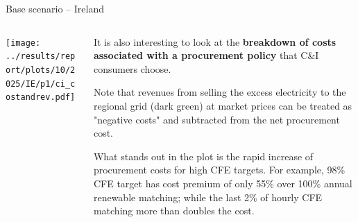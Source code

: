\begin{frame}{Base scenario -- Ireland}

    {\footnotesize
    \vspace{0.3cm}
    
    \begin{columns}[T]
    \begin{column}{9cm}
    \centering
    
    \texttt{[image: ../results/report/plots/10/2025/IE/p1/ci\_costandrev.pdf]}
    \end{column}
    \begin{column}{6cm}
    
    \vspace{0.3cm}
    It is also interesting to look at the {\bf breakdown of costs associated with
    a procurement policy} that C\&I consumers choose. 
    
    \vspace{0.3cm}
    Note that revenues from selling the excess electricity to the regional grid 
    (dark green) at market prices can be treated as "negative costs" and 
    subtracted from the net procurement cost.

    \vspace{0.3cm}
    What stands out in the plot is the rapid increase of procurement costs  
    for high CFE targets. For example, 98\% CFE target has 
    cost premium of only 55\% over 100\% annual renewable matching; while
    \alert{the last 2\% of hourly CFE matching more than doubles the 
    cost}.
  
    \end{column}
    \end{columns}
    }
    \end{frame}



